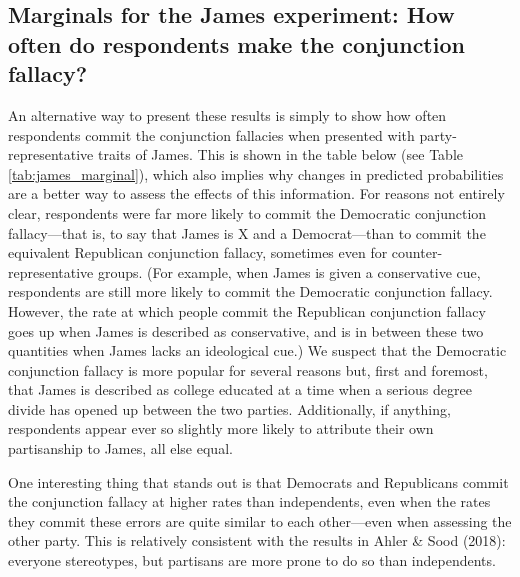 \documentclass[12pt, letterpaper]{article}
\begin{document}



\clearpage
\subsection{Marginals for the James experiment: How often do respondents make the conjunction fallacy?} \label{si:marginals}

An alternative way to present these results is simply to show how often respondents commit the conjunction fallacies when presented with party-representative traits of James. This is shown in the table below (see Table \ref{tab:james_marginal}), which also implies why changes in predicted probabilities are a better way to assess the effects of this information. For reasons not entirely clear, respondents were far more likely to commit the Democratic conjunction fallacy---that is, to say that James is X and a Democrat---than to commit the equivalent Republican conjunction fallacy, sometimes even for counter-representative groups. (For example, when James is given a conservative cue, respondents are still more likely to commit the Democratic conjunction fallacy. However, the rate at which people commit the Republican conjunction fallacy goes up when James is described as conservative, and is in between these two quantities when James lacks an ideological cue.) We suspect that the Democratic conjunction fallacy is more popular for several reasons but, first and foremost, that James is described as college educated at a time when a serious degree divide has opened up between the two parties. Additionally, if anything, respondents appear ever so slightly more likely to attribute their own partisanship to James, all else equal.

One interesting thing that stands out is that Democrats and Republicans commit the conjunction fallacy at higher rates than independents, even when the rates they commit these errors are quite similar to each other---even when assessing the other party. This is relatively consistent with the results in Ahler \& Sood (2018): everyone stereotypes, but partisans are more prone to do so than independents.



\clearpage
\end{document}
